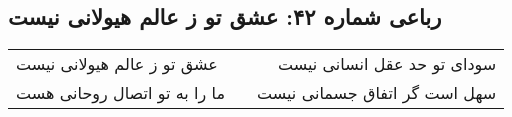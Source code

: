 \begin{center}
\section*{رباعی شماره ۴۲: عشق تو ز عالم هیولانی نیست}
\label{sec:042}
\begin{longtable}{l p{0.5cm} r}
عشق تو ز عالم هیولانی نیست
&&
سودای تو حد عقل انسانی نیست
\\
ما را به تو اتصال روحانی هست
&&
سهل است گر اتفاق جسمانی نیست
\\
\end{longtable}
\end{center}
